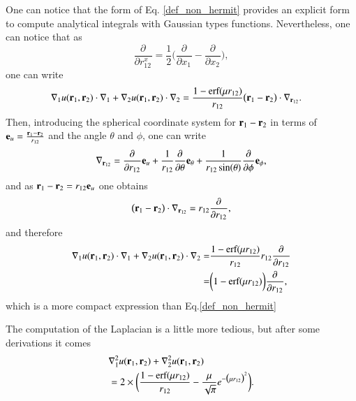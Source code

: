 \documentclass[aip,jcp,reprint,noshowkeys,superscriptaddress]{revtex4-1}
\newcommand{\deriv}[3]{\frac{\partial^{#3} #1}{\partial {#2}^{#3}}}
\newcommand{\br}[0]{{\bf {r}}}
\newcommand{\bri}[1]{{\bf r}_{#1}}
\begin{document}
One can notice that the form of Eq. \eqref{def_non_hermit} provides an explicit form to compute analytical integrals with Gaussian types functions. 
Nevertheless, one can notice that as 
\begin{equation}
 \deriv{}{r_{12}^x}{} = \frac{1}{2} \bigg( \deriv{}{x_1}{} - \deriv{}{x_2}{} \bigg),
\end{equation}
one can write 
\begin{equation}
 \begin{aligned}
 \label{eq:nabla_i_nabla0}
& \nabla_1 u(\br{}_1,\br{}_2) \cdot \nabla_1 + \nabla_2 u(\br{}_1,\br{}_2) \cdot \nabla_2 = \frac{1 - \text{erf}(\mu r_{12})}{r_{12}} \big( \br{}_1 - \br{}_2 \big) \cdot \nabla_{\br{}_{12}}.
 \end{aligned}
\end{equation}
Then, introducing the spherical coordinate system for $\br{}_1 - \br{}_2$ in terms of ${\bf e}_u= \frac{\br{}_1 - \br{}_2}{r_{12}}$ and the angle $\theta$ and $\phi$, one can write 
\begin{equation}
 \nabla_{\br{}_{12}} = \deriv{}{r_{12}}{} {\bf e}_u + \frac{1}{r_{12}} \deriv{}{\theta}{} {\bf e}_{\theta} + \frac{1}{r_{12} \sin(\theta)} \deriv{}{\phi}{} {\bf e}_\phi,
\end{equation}
and as $\br{}_1 - \br{}_2 = r_{12} {\bf e}_u$ one obtains
\begin{equation}
 \big( \br{}_1 - \br{}_2 \big) \cdot \nabla_{\br{}_{12}} = r_{12} \deriv{}{r_{12}}{},
\end{equation}
and therefore 
\begin{equation}
 \begin{aligned}
 \label{eq:nabla_i_nabla1}
 \nabla_1 u(\br{}_1,\br{}_2) \cdot \nabla_1 + \nabla_2 u(\br{}_1,\br{}_2) \cdot \nabla_2 = & \frac{1 - \text{erf}(\mu r_{12})}{r_{12}} r_{12} \deriv{}{r_{12}}{} \\
 = & \bigg( 1 - \text{erf}(\mu r_{12})\bigg) \deriv{}{r_{12}}{},
 \end{aligned}
\end{equation}
which is a more compact expression than Eq.\eqref{def_non_hermit}

The computation of the Laplacian is a little more tedious, but after some derivations it comes  
\begin{equation}
 \begin{aligned}
 \label{eq:d2_x1_2}
 &\nabla_1^2 u(\bri{1},\bri{2}) + \nabla_2^2u(\bri{1},\bri{2})\\ 
 & = 2 \times \bigg( \frac{1 - \text{erf}(\mu r_{12})}{r_{12}} - \frac{\mu}{\sqrt{\pi}} e^{-\big(\mu r_{12} \big)^2}  \bigg).
 \end{aligned}
\end{equation}
\end{document}
